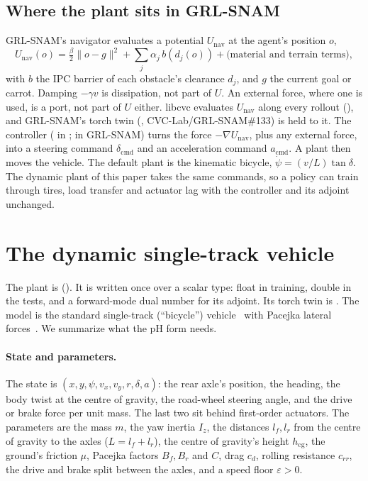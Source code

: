 \documentclass[11pt]{article}
\theoremstyle{remark}
\begin{document}
\subsection{Where the plant sits in GRL-SNAM}
GRL-SNAM's navigator evaluates a potential $U_{\mathrm{nav}}$ at the agent's position $o$,
\begin{equation}
  U_{\mathrm{nav}}(o)=\tfrac{\beta}{2}\lVert o-g\rVert^2+\textstyle\sum_j\alpha_j\,b(d_j(o))
  +\text{(material and terrain terms)},
  \label{eq:unav}
\end{equation}
with $b$ the IPC barrier of each obstacle's clearance $d_j$, and $g$ the current goal or carrot.
Damping $-\gamma v$ is dissipation, not part of $U$. An external force, where one is used, is a
port, not part of $U$ either. libcvc evaluates $U_{\mathrm{nav}}$ along every rollout
(), and GRL-SNAM's torch twin
(, CVC-Lab/GRL-SNAM\#133) is held to it. The controller
( in ;  in GRL-SNAM)
turns the force $-\nabla U_{\mathrm{nav}}$, plus any external force, into a steering command
$\delta_{\mathrm{cmd}}$ and an acceleration command $a_{\mathrm{cmd}}$. A plant then moves the
vehicle. The default plant is the kinematic bicycle, $\dot\psi=(v/L)\tan\delta$. The dynamic plant
of this paper takes the same commands, so a policy can train through tires, load transfer and
actuator lag with the controller and its adjoint unchanged.

\section{The dynamic single-track vehicle}
\label{sec:model}

The plant is  (). It is
written once over a scalar type: float in training, double in the tests, and a forward-mode dual
number for its adjoint. Its torch twin is . The model is the
standard single-track (``bicycle'') vehicle~\cite{rajamani2012} with Pacejka lateral
forces~\cite{pacejka2012}. We summarize what the pH form needs.

\paragraph{State and parameters.} The state is $(x,y,\psi,v_x,v_y,r,\delta,a)$: the rear axle's
position, the heading, the body twist at the centre of gravity, the road-wheel steering angle, and
the drive or brake force per unit mass. The last two sit behind first-order actuators. The
parameters are the mass $m$, the yaw inertia $I_z$, the distances $l_f,l_r$ from the centre of
gravity to the axles ($L=l_f+l_r$), the centre of gravity's height $h_{\mathrm{cg}}$, the ground's
friction $\mu$, Pacejka factors $B_f,B_r$ and $C$, drag $c_d$, rolling resistance $c_{rr}$, the
drive and brake split between the axles, and a speed floor $\varepsilon>0$.
\end{document}
